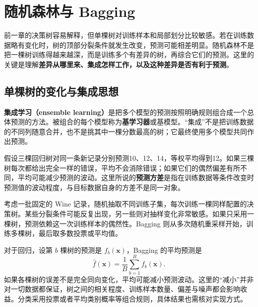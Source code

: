 \chapter{随机森林与 Bagging}

前一章的决策树容易解释，但单棵树对训练样本和局部划分比较敏感。若在训练数据略有变化时，树的顶部分裂条件就发生改变，预测可能相差明显。随机森林不是把一棵树训练得越来越深，而是训练多个有差异的树，再综合它们的预测。这里的关键是理解\textbf{差异从哪里来、集成怎样工作，以及这种差异是否有利于预测}。
\section{单棵树的变化与集成思想}

\textbf{集成学习（ensemble learning）}是把多个模型的预测按照明确规则组合成一个总体预测的方法。被组合的每个模型称为\textbf{基学习器}或基模型。“集成”不是把训练数据的不同列随意合并，也不是挑其中一棵分数最高的树；它最终使用多个模型共同作出预测。

假设三棵回归树对同一条新记录分别预测10、12、14，等权平均得到12。如果三棵树每次都给出完全一样的错误，平均不会消除错误；如果它们的偶然偏差有所不同，平均可能减少预测的波动。这里所说的\textbf{预测方差}是指在训练数据等条件改变时预测值的波动程度，与目标数据自身的方差不是同一对象。

考虑一批固定的 Wine 记录，随机抽取不同训练子集，每次训练一棵同样配置的决策树。某些分裂条件可能反复出现，另一些则对抽样变化非常敏感。如果只采用一棵树，预测依赖这一次训练样本的偶然性。Bagging 则从多次随机重采样开始，训练多棵树，最后取多数投票或平均值。

对于回归，设第 $b$ 棵树的预测是 $f_b(\mathbf x)$，Bagging 的平均预测是
\begin{equation}
\hat f(\mathbf x)=\frac1B\sum_{b=1}^B f_b(\mathbf x).
\end{equation}
如果各棵树的误差不是完全同向变化，平均可能减小预测波动。这里的“减小”并非对一切数据都保证，树之间的相关程度、训练样本数量、偏差与噪声都会影响收益。分类采用投票或者平均类别概率等组合规则，具体结果也需核对实现方式。

